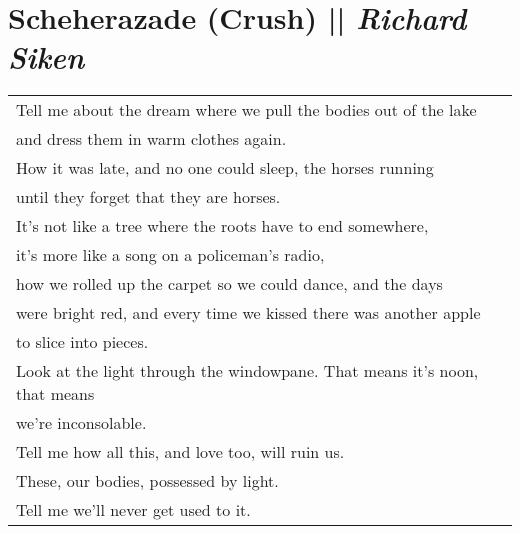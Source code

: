\section[Scheherazade (Crush)]{Scheherazade (Crush) || \emph{Richard Siken} \hspace*{\fill}  \thepage}
\vspace*{2.75cm}
\begin{center}
\begin{tabular}{l}
Tell me about the dream where we pull the bodies out of the lake\\
and dress them in warm clothes again.\\
How it was late, and no one could sleep, the horses running\\
until they forget that they are horses.\\
It’s not like a tree where the roots have to end somewhere,\\
it’s more like a song on a policeman’s radio,\\
how we rolled up the carpet so we could dance, and the days\\
were bright red, and every time we kissed there was another apple\\
to slice into pieces.\\
Look at the light through the windowpane. That means it’s noon, that means\\
we’re inconsolable.\\
Tell me how all this, and love too, will ruin us.\\
These, our bodies, possessed by light.\\
Tell me we’ll never get used to it.
\end{tabular}
\end{center}